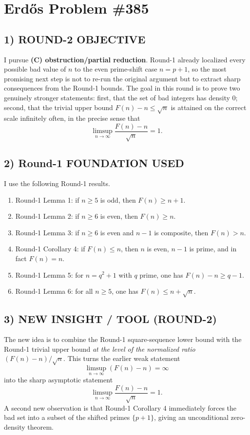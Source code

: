 \section*{Erd\H{o}s Problem \#385}

\subsection*{1) ROUND-2 OBJECTIVE}
I pursue \textbf{(C) obstruction/partial reduction}. Round-1 already localized every possible bad value of $n$ to the even prime-shift case $n=p+1$, so the most promising next step is not to re-run the original argument but to extract sharp consequences from the Round-1 bounds. The goal in this round is to prove two genuinely stronger statements: first, that the set of bad integers has density $0$; second, that the trivial upper bound $F(n)-n\leq \sqrt n$ is attained on the correct scale infinitely often, in the precise sense that
\[
\limsup_{n\to\infty}\frac{F(n)-n}{\sqrt n}=1.
\]

\subsection*{2) Round-1 FOUNDATION USED}
I use the following Round-1 results.

\begin{enumerate}
\item Round-1 Lemma 1: if $n\geq 5$ is odd, then $F(n)\geq n+1$.
\item Round-1 Lemma 2: if $n\geq 6$ is even, then $F(n)\geq n$.
\item Round-1 Lemma 3: if $n\geq 6$ is even and $n-1$ is composite, then $F(n)>n$.
\item Round-1 Corollary 4: if $F(n)\leq n$, then $n$ is even, $n-1$ is prime, and in fact $F(n)=n$.
\item Round-1 Lemma 5: for $n=q^2+1$ with $q$ prime, one has $F(n)-n\geq q-1$.
\item Round-1 Lemma 6: for all $n\geq 5$, one has $F(n)\leq n+\sqrt n$.
\end{enumerate}

\subsection*{3) NEW INSIGHT / TOOL (ROUND-2)}
The new idea is to combine the Round-1 square-sequence lower bound with the Round-1 trivial upper bound \emph{at the level of the normalized ratio} $(F(n)-n)/\sqrt n$. This turns the earlier weak statement
\[
\limsup_{n\to\infty}(F(n)-n)=\infty
\]
into the sharp asymptotic statement
\[
\limsup_{n\to\infty}\frac{F(n)-n}{\sqrt n}=1.
\]
A second new observation is that Round-1 Corollary 4 immediately forces the bad set into a subset of the shifted primes $\{p+1\}$, giving an unconditional zero-density theorem.

